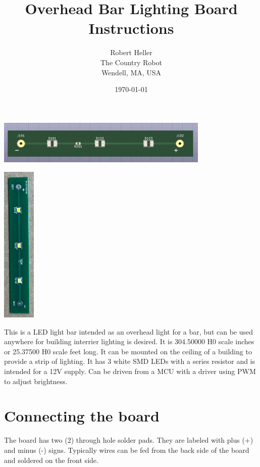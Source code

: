 \documentclass[12pt,twoside]{article}
\title{Overhead Bar Lighting Board Instructions}
\author{Robert Heller \\ The Country Robot \\ Wendell, MA, USA}
\date{\today}
\begin{document}
\maketitle

\begin{centering}\includegraphics[width=4in]{BarOverhead-3D.png}\\\end{centering}
\begin{centering}\includegraphics[height=3in]{BarOverhead-Photo.png}\\\end{centering}

This is a LED light bar intended as an overhead light for a bar, but can be
used anywhere for building interrier lighting is desired. It is 304.50000 H0
scale inches or 25.37500 H0 scale feet long. It can be mounted on the ceiling
of a building to provide a strip of lighting. It has 3 white SMD LEDs with a
series resistor and is intended for a 12V supply. Can be driven from a MCU
with a driver using PWM to adjust brightness.

\section{Connecting the board}

The board has two (2) through hole solder pads. They are labeled with plus (+) 
and minus (-) signs.  Typically wires can be fed from the back side of the 
board and soldered on the front side.
\end{document}
